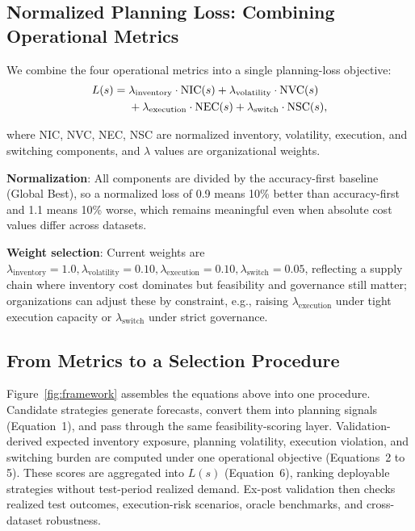 \subsection{Normalized Planning Loss: Combining Operational Metrics}

We combine the four operational metrics into a single planning-loss objective:
\begin{align}
L(s)={}&
\lambda_{\mathrm{inventory}}\cdot \mathrm{NIC}(s)
+\lambda_{\mathrm{volatility}}\cdot \mathrm{NVC}(s) \notag \\
&+\lambda_{\mathrm{execution}}\cdot \mathrm{NEC}(s)
+\lambda_{\mathrm{switch}}\cdot \mathrm{NSC}(s),
\end{align}

where NIC, NVC, NEC, NSC are normalized inventory, volatility, execution, and switching components, and $\lambda$ values are organizational weights.

\textbf{Normalization}: All components are divided by the accuracy-first baseline (Global Best), so a normalized loss of 0.9 means 10\% better than accuracy-first and 1.1 means 10\% worse, which remains meaningful even when absolute cost values differ across datasets.

\textbf{Weight selection}: Current weights are $\lambda_{\mathrm{inventory}}=1.0, \lambda_{\mathrm{volatility}}=0.10, \lambda_{\mathrm{execution}}=0.10, \lambda_{\mathrm{switch}}=0.05$, reflecting a supply chain where inventory cost dominates but feasibility and governance still matter; organizations can adjust these by constraint, e.g., raising $\lambda_{\mathrm{execution}}$ under tight execution capacity or $\lambda_{\mathrm{switch}}$ under strict governance.

\subsection{From Metrics to a Selection Procedure}

Figure~\ref{fig:framework} assembles the equations above into one procedure. Candidate strategies generate forecasts, convert them into planning signals (Equation~1), and pass through the same feasibility-scoring layer. Validation-derived expected inventory exposure, planning volatility, execution violation, and switching burden are computed under one operational objective (Equations~2 to 5). These scores are aggregated into $L(s)$ (Equation~6), ranking deployable strategies without test-period realized demand. Ex-post validation then checks realized test outcomes, execution-risk scenarios, oracle benchmarks, and cross-dataset robustness.

